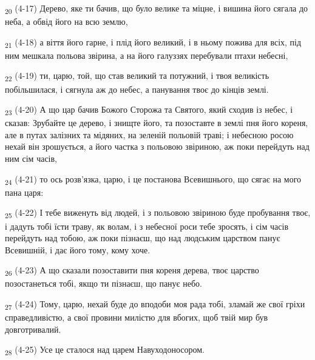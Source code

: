 \begin{tcolorbox}
\textsubscript{20} (4-17) Дерево, яке ти бачив, що було велике та міцне, і вишина його сягала до неба, а обвід його на всю землю,
\end{tcolorbox}
\begin{tcolorbox}
\textsubscript{21} (4-18) а віття його гарне, і плід його великий, і в ньому пожива для всіх, під ним мешкала польова звірина, а на його галуззях перебували птахи небесні,
\end{tcolorbox}
\begin{tcolorbox}
\textsubscript{22} (4-19) ти, царю, той, що став великий та потужний, і твоя великість побільшилася, і сягнула аж до небес, а панування твоє до кінців землі.
\end{tcolorbox}
\begin{tcolorbox}
\textsubscript{23} (4-20) А що цар бачив Божого Сторожа та Святого, який сходив із небес, і сказав: Зрубайте це дерево, і знищте його, та позоставте в землі пня його кореня, але в путах залізних та мідяних, на зеленій польовій траві; і небесною росою нехай він зрошується, а його частка з польовою звіриною, аж поки перейдуть над ним сім часів,
\end{tcolorbox}
\begin{tcolorbox}
\textsubscript{24} (4-21) то ось розв'язка, царю, і це постанова Всевишнього, що сягає на мого пана царя:
\end{tcolorbox}
\begin{tcolorbox}
\textsubscript{25} (4-22) І тебе виженуть від людей, і з польовою звіриною буде пробування твоє, і дадуть тобі їсти траву, як волам, і з небесної роси тебе зросять, і сім часів перейдуть над тобою, аж поки пізнаєш, що над людським царством панує Всевишній, і дає його тому, кому хоче.
\end{tcolorbox}
\begin{tcolorbox}
\textsubscript{26} (4-23) А що сказали позоставити пня кореня дерева, твоє царство позостанеться тобі, якщо ти пізнаєш, що панує небо.
\end{tcolorbox}
\begin{tcolorbox}
\textsubscript{27} (4-24) Тому, царю, нехай буде до вподоби моя рада тобі, зламай же свої гріхи справедливістю, а свої провини милістю для вбогих, щоб твій мир був довготривалий.
\end{tcolorbox}
\begin{tcolorbox}
\textsubscript{28} (4-25) Усе це сталося над царем Навуходоносором.
\end{tcolorbox}
